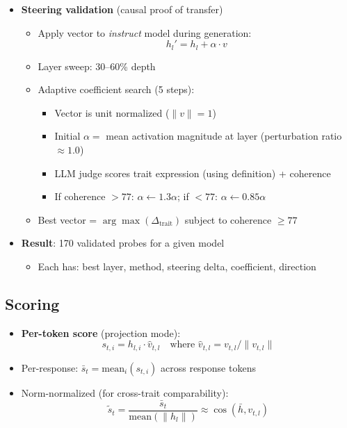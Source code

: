 \documentclass[11pt]{article}
\begin{document}
\begin{itemize}
  \item \textbf{Steering validation} (causal proof of transfer)
  \begin{itemize}
    \item Apply vector to \emph{instruct} model during generation:
    \begin{equation}
      h_l' = h_l + \alpha \cdot v
    \end{equation}
    \item Layer sweep: 30--60\% depth
    \item Adaptive coefficient search (5 steps):
    \begin{itemize}
      \item Vector is unit normalized ($\|v\| = 1$)
      \item Initial $\alpha = $ mean activation magnitude at layer (perturbation ratio $\approx 1.0$)
      \item LLM judge scores trait expression (using definition) + coherence
      \item If coherence $> 77$: $\alpha \leftarrow 1.3\alpha$; if $< 77$: $\alpha \leftarrow 0.85\alpha$
    \end{itemize}
    \item Best vector = $\arg\max(\Delta_{\text{trait}})$ subject to coherence $\geq 77$
  \end{itemize}

  \item \textbf{Result}: 170 validated probes for a given model
  \begin{itemize}
    \item Each has: best layer, method, steering delta, coefficient, direction
  \end{itemize}
\end{itemize}


\subsection{Scoring}

\begin{itemize}
  \item \textbf{Per-token score} (projection mode):
  \begin{equation}
    s_{t,i} = h_{l,i} \cdot \hat{v}_{t,l} \quad \text{where } \hat{v}_{t,l} = v_{t,l} / \|v_{t,l}\|
  \end{equation}
  \item Per-response: $\bar{s}_t = \text{mean}_i(s_{t,i})$ across response tokens
  \item Norm-normalized (for cross-trait comparability):
  \begin{equation}
    \tilde{s}_t = \frac{\bar{s}_t}{\text{mean}(\|h_{l}\|)} \approx \cos(\bar{h}, v_{t,l})
  \end{equation}
\end{itemize}
\end{document}
